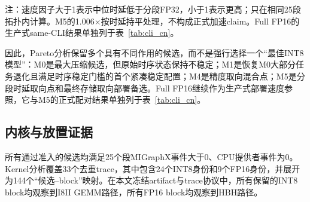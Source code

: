 \documentclass[conference]{IEEEtran}
\begin{document}
\begin{table}[t]
\caption{25段配置的同拓扑性能（Batch 1，30次预热，$3\times100$次）}
\label{tab:performance_cn}
\centering
\small
{}
\parbox{\textwidth}{\footnotesize 注：速度因子大于1表示中位时延低于分段FP32，小于1表示更高；只在相同25段拓扑内计算。M5的1.006$\times$按时延持平处理，不构成正式加速claim。Full FP16的生产式same-CLI结果单独列于表~\ref{tab:cli_cn}。}
\end{table}

因此，Pareto分析保留多个具有不同作用的候选，而不是强行选择一个“最佳INT8模型”：M0是最大压缩候选，但原始时序状态保持不稳定；M1是恢复M0大部分任务退化且满足时序稳定门槛的首个紧凑稳定配置；M4是精度取向混合点；M5是分段时延取向点和最终存储取向部署备选。Full FP16继续作为生产式部署速度参照，它与M5的正式配对结果单独列于表~\ref{tab:cli_cn}。

\subsection{内核与放置证据}

所有通过准入的候选均满足25个段MIGraphX事件大于0、CPU提供者事件为0。Kernel分析覆盖33个去重trace，其中包含24个INT8身份和9个FP16身份，并展开为144个“候选--block”映射。在本文冻结artifact与trace协议中，所有保留的INT8 block均观察到I8II GEMM路径，所有FP16 block均观察到HBH路径。
\end{document}
